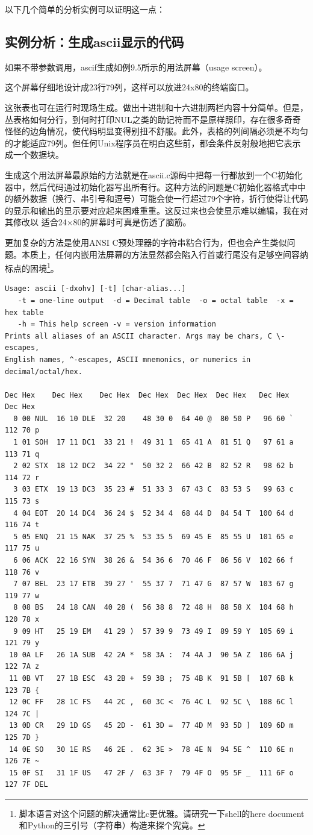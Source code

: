 \documentclass[12pt,oneside]{book}
\begin{document}
以下几个简单的分析实例可以证明这一点：

\subsection{实例分析：生成ascii显示的代码}
如果不带参数调用，ascif生成如例9.5所示的用法屏幕（usage screen）。

这个屏幕仔细地设计成23行79列，这样可以放进24x80的终端窗口。

这张表也可在运行时现场生成。做出十进制和十六进制两栏内容十分简单。但是，丛表格如何分行，到何时打印NUL之类的助记符而不是原样照印，存在很多奇奇怪怪的边角情况，使代码明显变得别扭不舒服。此外，表格的列间隔必须是不均匀的才能适应79列。但任何Unix程序员在明白这些前，都会条件反射般地把它表示成一个数据块。

生成这个用法屏幕最原始的方法就是在ascii.c源码中把每一行都放到一个C初始化器中，然后代码通过初始化器写出所有行。这种方法的问题是C初始化器格式中中的额外数据（换行、串引号和逗号）可能会使一行超过79个字符，折行使得让代码的显示和输出的显示要对应起来困难重重。这反过来也会使显示难以编辑，我在对其修改以
适合24×80的屏幕时可真是伤透了脑筋。

更加复杂的方法是使用ANSI C预处理器的字符串粘合行为，但也会产生类似问题。本质上，任何内嵌用法屏幕的方法显然都会陷入行首或行尾没有足够空间容纳标点的困境\footnote{脚本语言对这个问题的解决通常比c更优雅。请研究一下shell的here document和Python的三引号（字符串）构造来探个究竟。}。

\begin{Verbatim}[label=例9.5 ascii用法屏幕]
Usage: ascii [-dxohv] [-t] [char-alias...]
   -t = one-line output  -d = Decimal table  -o = octal table  -x = hex table
   -h = This help screen -v = version information
Prints all aliases of an ASCII character. Args may be chars, C \-escapes,
English names, ^-escapes, ASCII mnemonics, or numerics in decimal/octal/hex.

Dec Hex    Dec Hex    Dec Hex  Dec Hex  Dec Hex  Dec Hex   Dec Hex   Dec Hex
  0 00 NUL  16 10 DLE  32 20    48 30 0  64 40 @  80 50 P   96 60 `  112 70 p
  1 01 SOH  17 11 DC1  33 21 !  49 31 1  65 41 A  81 51 Q   97 61 a  113 71 q
  2 02 STX  18 12 DC2  34 22 "  50 32 2  66 42 B  82 52 R   98 62 b  114 72 r
  3 03 ETX  19 13 DC3  35 23 #  51 33 3  67 43 C  83 53 S   99 63 c  115 73 s
  4 04 EOT  20 14 DC4  36 24 $  52 34 4  68 44 D  84 54 T  100 64 d  116 74 t
  5 05 ENQ  21 15 NAK  37 25 %  53 35 5  69 45 E  85 55 U  101 65 e  117 75 u
  6 06 ACK  22 16 SYN  38 26 &  54 36 6  70 46 F  86 56 V  102 66 f  118 76 v
  7 07 BEL  23 17 ETB  39 27 '  55 37 7  71 47 G  87 57 W  103 67 g  119 77 w
  8 08 BS   24 18 CAN  40 28 (  56 38 8  72 48 H  88 58 X  104 68 h  120 78 x
  9 09 HT   25 19 EM   41 29 )  57 39 9  73 49 I  89 59 Y  105 69 i  121 79 y
 10 0A LF   26 1A SUB  42 2A *  58 3A :  74 4A J  90 5A Z  106 6A j  122 7A z
 11 0B VT   27 1B ESC  43 2B +  59 3B ;  75 4B K  91 5B [  107 6B k  123 7B {
 12 0C FF   28 1C FS   44 2C ,  60 3C <  76 4C L  92 5C \  108 6C l  124 7C |
 13 0D CR   29 1D GS   45 2D -  61 3D =  77 4D M  93 5D ]  109 6D m  125 7D }
 14 0E SO   30 1E RS   46 2E .  62 3E >  78 4E N  94 5E ^  110 6E n  126 7E ~
 15 0F SI   31 1F US   47 2F /  63 3F ?  79 4F O  95 5F _  111 6F o  127 7F DEL
\end{Verbatim}
\end{document}
